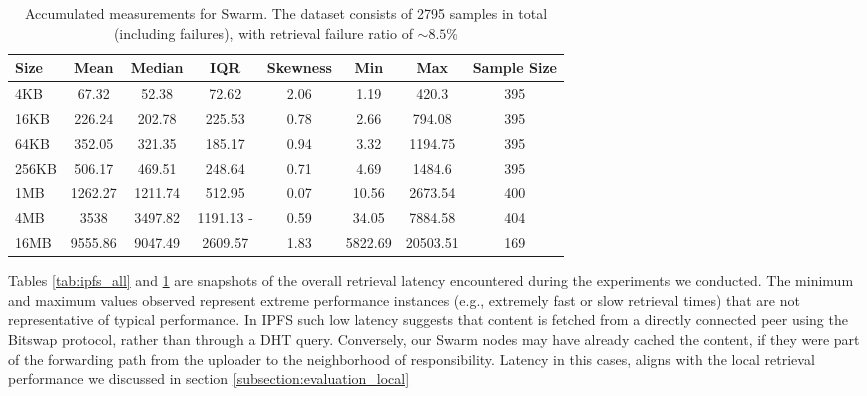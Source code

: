 \begin{table}[H]
\centering
\begin{small}
\caption{Accumulated measurements for Swarm. The dataset consists of 2795 samples in total (including failures), with retrieval failure ratio of $\sim 8.5\%$ }
\label{tab:swarm_all}
\begin{tabular}{@{}lccccccc@{}}
\toprule
Size & Mean & Median & IQR & Skewness & Min & Max & Sample Size \\ \midrule
4KB & 67.32 & 52.38 & 72.62 & 2.06 & 1.19 & 420.3 & 395\\
16KB & 226.24 & 202.78 & 225.53 & 0.78 & 2.66 & 794.08 & 395\\
64KB & 352.05 & 321.35 & 185.17 & 0.94 & 3.32 & 1194.75 & 395\\
256KB & 506.17 & 469.51 & 248.64 & 0.71 & 4.69 & 1484.6 & 395\\
1MB & 1262.27 & 1211.74 & 512.95 & 0.07 & 10.56 & 2673.54 & 400\\
4MB & 3538 & 3497.82 & 1191.13 -& 0.59 & 34.05 & 7884.58 & 404\\
16MB & 9555.86 & 9047.49 & 2609.57 & 1.83 & 5822.69 & 20503.51 & 169\\
\bottomrule
\end{tabular}
\end{small}
\end{table}


Tables \ref{tab:ipfs_all} and \ref{tab:swarm_all} are snapshots of the overall retrieval latency encountered during the experiments we conducted. The minimum and maximum values observed represent extreme performance instances (e.g., extremely fast or slow retrieval times) that are not representative of typical performance. In IPFS such low latency suggests that content is fetched from a directly connected peer using the Bitswap protocol, rather than through a DHT query. Conversely, our Swarm nodes may have already cached the content, if they were part of the forwarding path from the uploader to the neighborhood of responsibility. Latency in this cases, aligns with the local retrieval performance we discussed in section \ref{subsection:evaluation_local}

